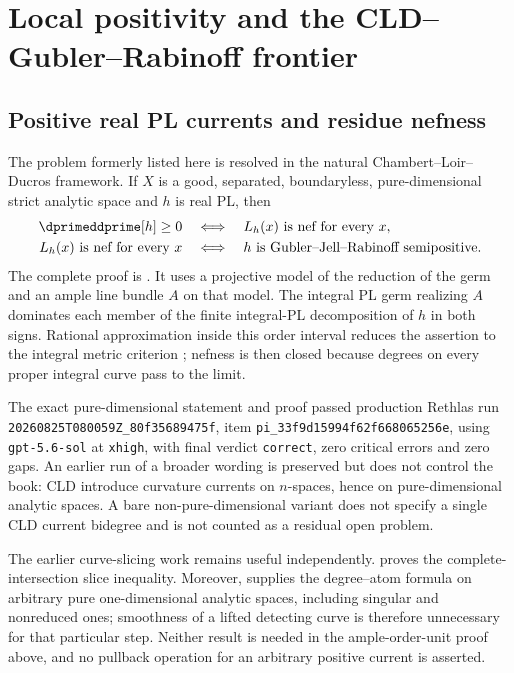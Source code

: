 \section{Local positivity and the CLD--Gubler--Rabinoff frontier}

\subsection{Positive real PL currents and residue nefness}
\label{sec:ch72-resolved-current-residue}

The problem formerly listed here is resolved in the natural
Chambert--Loir--Ducros framework.  If $X$ is a good, separated,
boundaryless, pure-dimensional strict analytic space and $h$ is real PL,
then
\[
\begin{aligned}
 \dprimeddprime[h]\geq0
 &\quad\Longleftrightarrow\quad
 L_h(x)\text{ is nef for every }x,\\
 L_h(x)\text{ is nef for every }x
 &\quad\Longleftrightarrow\quad
 h\text{ is Gubler--Jell--Rabinoff semipositive}.
\end{aligned}
\]
The complete proof is .
It uses a projective model of the reduction of the germ and an ample line
bundle $A$ on that model.  The integral PL germ realizing $A$ dominates
each member of the finite integral-PL decomposition of $h$ in both signs.
Rational approximation inside this order interval reduces the assertion to
the integral metric criterion \cite[Corollary~18.8.8]{CLD25}; nefness is
then closed because degrees on every proper integral curve pass to the
limit.

The exact pure-dimensional statement and proof passed production Rethlas
run \nolinkurl{20260825T080059Z_80f35689475f}, item
\nolinkurl{pi_33f9d15994f62f668065256e}, using
\texttt{gpt-5.6-sol} at \texttt{xhigh}, with final verdict
\texttt{correct}, zero critical errors and zero gaps.  An earlier run of a
broader wording is preserved but does not control the book: CLD introduce
curvature currents on $n$-spaces, hence on pure-dimensional analytic
spaces.  A bare non-pure-dimensional variant does not specify a single CLD
current bidegree and is not counted as a residual open problem.

The earlier curve-slicing work remains useful independently.
 proves the complete-intersection
slice inequality.  Moreover, \cite[Theorem~18.4.7]{CLD25} supplies the
degree--atom formula on arbitrary pure one-dimensional analytic spaces,
including singular and nonreduced ones; smoothness of a lifted detecting
curve is therefore unnecessary for that particular step.  Neither result
is needed in the ample-order-unit proof above, and no pullback operation for
an arbitrary positive current is asserted.

